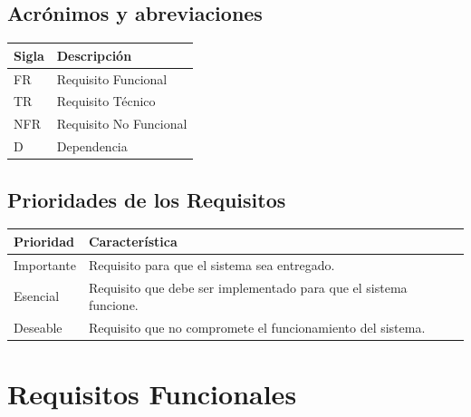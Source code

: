 \documentclass{article}
\begin{document}
  \subsection{Acrónimos y abreviaciones}
    \FloatBarrier
    \begin{table}[H]
      \begin{center}
        \begin{tabular}[pos]{|m{2cm} | m{12cm}|} 
          \hline
          \cellcolor[gray]{0.9}\textbf{Sigla} & \cellcolor[gray]{0.9}\textbf{Descripción} \\ \hline
          FR      & Requisito Funcional  \\ \hline
                    TR      & Requisito Técnico  \\ \hline
          NFR     & Requisito No Funcional  \\ \hline
          D       & Dependencia  \\ \hline
        \end{tabular}
      \end{center}
    \end{table}  

  \subsection{Prioridades de los Requisitos}
    \FloatBarrier
    \begin{table}[H]
      \begin{center}
        \begin{tabular}[pos]{|m{2cm} | m{12cm}|} 
          \hline
          \cellcolor[gray]{0.9}\textbf{Prioridad} & \cellcolor[gray]{0.9}\textbf{Característica} \\ \hline
          Importante     & Requisito para que el sistema sea entregado.  \\ \hline
          Esencial       & Requisito que debe ser implementado para que el sistema funcione.  \\ \hline
          Deseable       & Requisito que no compromete el funcionamiento del sistema.  \\ \hline
        \end{tabular}
      \end{center}
    \end{table}  

  \section{Requisitos Funcionales}
    
\end{document}
